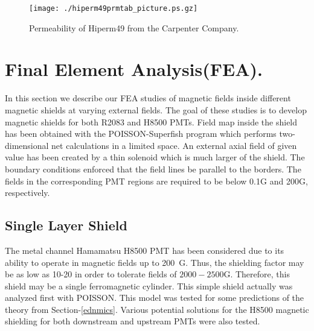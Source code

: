 \documentclass[12pt]{article}
\begin{document}
\begin{figure}[htbp]%
\begin{center}
\texttt{[image: ./hiperm49prmtab\_picture.ps.gz]}
\end{center}
\caption{Permeability of Hiperm49 from the Carpenter Company.
\label{hiperm49}}
\end{figure}
\clearpage








\newpage


\section{ Final Element Analysis(FEA).}
\label{FEA}

In this section we describe our  FEA studies of   magnetic fields
 inside  different magnetic shields at varying  external fields.
The goal of these  studies is to develop   
 magnetic shields for both  R2083 and H8500 PMTs.
Field map inside the  shield has been  obtained with 
the POISSON-Superfish  program  which performs two-dimensional net calculations 
in a limited space.   An  external axial  field of given value  has been
created by a thin solenoid  which is much  larger of the shield.
The boundary conditions enforced that the field lines be parallel to
the borders. 
 The  fields in the corresponding PMT regions are required  to be below 0.1G and 200G, respectively.
%





\newpage
\subsection{Single Layer Shield}
The metal channel Hamamatsu H8500 PMT has been 
considered due to its ability to operate in magnetic fields up to 200~G.
Thus, the shielding factor may be as low as 10-20 in order to tolerate
 fields of $2000-2500$G. Therefore, this
shield may be a  single  ferromagnetic cylinder.  
This simple shield actually was analyzed   first  
with POISSON.  This  model  was 
tested for some predictions of the  theory from Section-\ref{ednmics}.
Various potential solutions for the H8500 magnetic shielding for both  
downstream and upstream PMTs were also tested.
\end{document}
